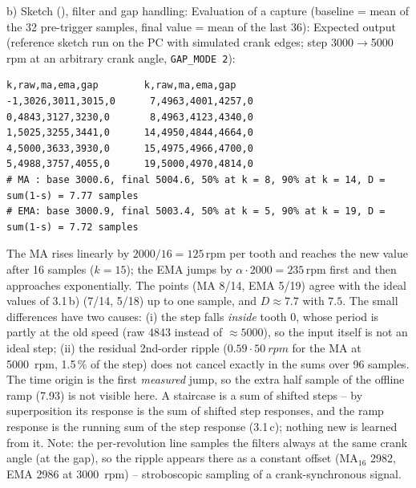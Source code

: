 \begin{solution}
b) Sketch (), filter
and gap handling:
Evaluation of a capture (baseline = mean of the 32 pre-trigger samples, final
value = mean of the last 36):
Expected output (reference sketch run on the PC with simulated crank edges;
step 3000$\to$5000\,rpm at an arbitrary crank angle, \texttt{GAP\_MODE 2}):
\begin{lstlisting}[style=shell,numbers=none]
k,raw,ma,ema,gap        k,raw,ma,ema,gap
-1,3026,3011,3015,0      7,4963,4001,4257,0
0,4843,3127,3230,0       8,4963,4123,4340,0
1,5025,3255,3441,0      14,4950,4844,4664,0
4,5000,3633,3930,0      15,4975,4966,4700,0
5,4988,3757,4055,0      19,5000,4970,4814,0
# MA : base 3000.6, final 5004.6, 50% at k = 8, 90% at k = 14, D = sum(1-s) = 7.77 samples
# EMA: base 3000.9, final 5003.4, 50% at k = 5, 90% at k = 19, D = sum(1-s) = 7.72 samples
\end{lstlisting}
The MA rises linearly by $2000/16=125$\,rpm per tooth and reaches the new
value after 16 samples ($k=15$); the EMA jumps by $\alpha\cdot2000=235$\,rpm
first and then approaches exponentially. The points (MA 8/14, EMA 5/19) agree
with the ideal values of 3.1\,b) (7/14, 5/18) up to one sample, and
$D\approx7.7$ with $7.5$. The small differences have two causes: (i) the
step falls \emph{inside} tooth 0, whose period is partly at the old speed
(raw 4843 instead of $\approx5000$), so the input itself is not an ideal
step; (ii) the residual 2nd-order ripple ($0.59\cdot\SI{50}{rpm}$ for the MA at
\SI{5000}{rpm}, 1.5\,\% of the step) does not cancel exactly in the sums over
96 samples. The time origin is the first \emph{measured} jump, so the extra
half sample of the offline ramp (7.93) is not visible here.
A staircase is a sum of shifted steps -- by superposition its response is the
sum of shifted step responses, and the ramp response is the running sum of the
step response (3.1\,c); nothing new is learned from it. Note: the
per-revolution line samples the filters always at the same crank angle (at the
gap), so the ripple appears there as a constant offset (MA$_{16}$ 2982, EMA 2986
at \SI{3000}{rpm}) -- stroboscopic sampling of a crank-synchronous signal.


\end{solution}
